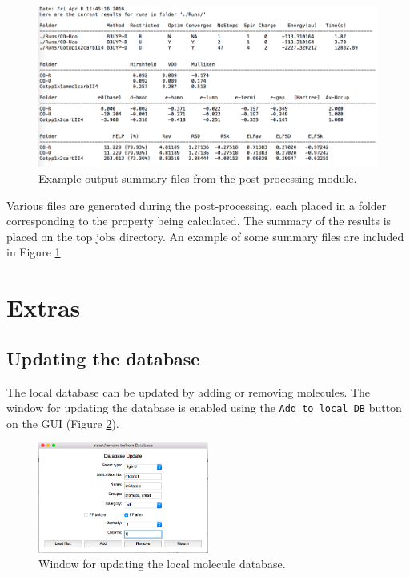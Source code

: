 \documentclass[a4paper,12pt]{assignment}
\begin{document}
\begin{figure}[htb!]
\centering
\includegraphics[width=\textwidth]{./Figures/fig16.png}
\caption{Example output summary files from the post processing module.}
\label{post1}
\end{figure}

Various files are generated during the post-processing, each placed in a folder corresponding to the property being calculated. The summary of the results is placed on the top jobs directory. An example of some summary files are included in Figure \ref{post1}.

\section{Extras}

\subsection{Updating the database}

The local database can be updated by adding or removing molecules. The window for updating the database is enabled using the \texttt{Add to local DB} button on the GUI (Figure \ref{ldb}).


\begin{figure}[htb!]
\centering
\includegraphics[width=0.5\textwidth]{./Figures/fig17.png}
\caption{Window for updating the local molecule database.}
\label{ldb}
\end{figure}
\end{document}
